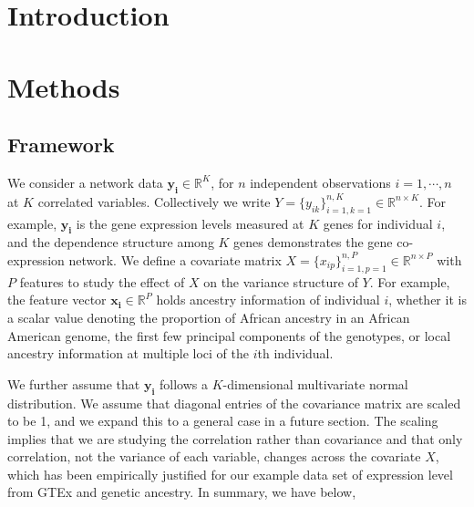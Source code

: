 \documentclass[12pt]{article}
\theoremstyle{theorem}
\begin{document}
\section{Introduction}



	
\section{Methods}
\subsection{Framework}
We consider a network data $\bm{y_i} \in \mathbb{R}^{K}$, for $n$ independent observations $i=1, \cdots, n$ at $K$ correlated variables. Collectively we write $Y = \{y_{ik}\}_{i=1, k=1}^{n,K} \in \mathbb{R}^{n \times K}$. For example, $\bm{y_i}$ is the gene expression levels measured at $K$ genes for individual $i$, and the dependence structure among $K$ genes demonstrates the gene co-expression network. We define a covariate matrix $X =\{x_{ip}\}_{i=1,p=1}^{n,P} \in \mathbb{R}^{n \times P}$ with $P$ features to study the effect of $X$ on the variance structure of $Y$. For example, the feature vector $\bm{x_i} \in \mathbb{R}^{P}$ holds ancestry information of individual $i$, whether it is a scalar value denoting the proportion of African ancestry in an African American genome, the first few principal components of the genotypes, or local ancestry information at multiple loci of the $i$th individual.  

\vspace{4mm}
\noindent We further assume that $\bm{y_i}$ follows a $K$-dimensional multivariate normal distribution. We assume that diagonal entries of the covariance matrix are scaled to be 1, and we expand this to a general case in a future section. The scaling implies that we are studying the correlation rather than covariance and that only correlation, not the variance of each variable, changes across the covariate $X$, which has been empirically justified for our example data set of expression level from GTEx and genetic ancestry. In summary, we have below,
\end{document}
